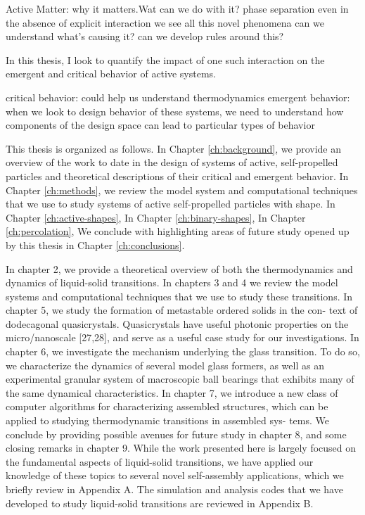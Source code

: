 
Active Matter: why it matters.Wat can we do with it?
phase separation even in the absence of explicit interaction
we see all this novel phenomena
can we understand what's causing it? can we develop rules around this?

In this thesis, I look to quantify the impact of one such interaction on the emergent and critical behavior of active systems.

critical behavior: could help us understand thermodynamics
emergent behavior: when we look to design behavior of these systems, we need to understand how components of the design space can lead to particular types of behavior


This thesis is organized as follows.
In Chapter \ref{ch:background}, we provide an overview of the work to date in the design of systems of active, self-propelled particles and theoretical descriptions of their critical and emergent behavior.
In Chapter \ref{ch:methods}, we review the model system and computational techniques that we use to study systems of active self-propelled particles with shape.
In Chapter \ref{ch:active-shapes},
In Chapter \ref{ch:binary-shapes},
In Chapter \ref{ch:percolation},
We conclude with highlighting areas of future study opened up by this thesis in Chapter \ref{ch:conclusions}.

In chapter 2, we provide a theoretical overview of both the thermodynamics and dynamics of liquid-solid transitions. In chapters 3 and 4 we review the model systems and computational techniques that we use to study these transitions. In chapter 5, we study the formation of metastable ordered solids in the con- text of dodecagonal quasicrystals. Quasicrystals have useful photonic properties on the micro/nanoscale [27,28], and serve as a useful case study for our investigations. In chapter 6, we investigate the mechanism underlying the glass transition. To do so, we characterize the dynamics of several model glass formers, as well as an experimental granular system of macroscopic ball bearings that exhibits many of the same dynamical characteristics. In chapter 7, we introduce a new class of computer algorithms for characterizing assembled structures, which can be applied to studying thermodynamic transitions in assembled sys- tems. We conclude by providing possible avenues for future study in chapter 8, and some closing remarks in chapter 9. While the work presented here is largely focused on the fundamental aspects of liquid-solid transitions, we have applied our knowledge of these topics to several novel self-assembly applications, which we briefly review in Appendix A. The simulation and analysis codes that we have developed to study liquid-solid transitions are reviewed in Appendix B.

